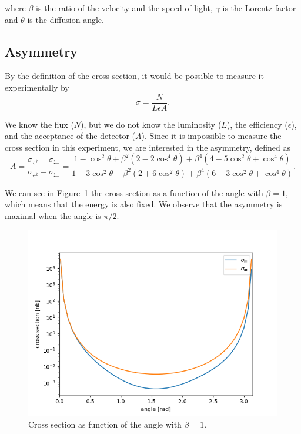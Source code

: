 \documentclass[10pt,swedish, openany]{book}
\begin{document}
where $\beta$ is the ratio of the velocity and the speed of light, $\gamma$ is the Lorentz factor and $\theta$ is the diffusion angle.

\subsection{Asymmetry}
\label{asym}

By the definition of the cross section, it would be possible to measure it experimentally by
\begin{equation}
    \sigma = \frac{N}{L \epsilon A}.
\end{equation}

We know the flux ($N$), but we do not know the luminosity ($L$), the efficiency ($\epsilon$), and the acceptance of the detector ($A$). Since it is impossible to measure the cross section in this experiment, we are interested in the asymmetry, defined as
\begin{equation}\label{27}
    A = \frac{\sigma_{\rightleftarrows}-\sigma_{\leftleftarrows}}{\sigma_{\rightleftarrows}+\sigma_{\leftleftarrows}} = \frac{1-\cos^2{\theta}+\beta^2(2-2\cos^4{\theta})+\beta^4(4-5\cos^2{\theta}+\cos^4{\theta})}{1+3\cos^2{\theta}+\beta^2(2+6\cos^2{\theta})+\beta^4(6-3\cos^2{\theta}+\cos^4{\theta})}.
\end{equation}

We can see in Figure~\ref{fig:angle} the cross section as a function of the angle with $\beta=1$, which means that the energy is also fixed. We observe that the asymmetry is maximal when the angle is $\pi/2$.

\begin{figure}[H]
\includegraphics[scale=0.5]{angle.png}
\centering
\caption{Cross section as function of the angle with $\beta = 1$.}
\label{fig:angle}
\end{figure}
\end{document}

